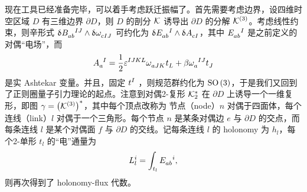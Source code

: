 			现在工具已经准备完毕，可以着手考虑跃迁振幅了。首先需要考虑边界，设四维时空区域 $D$ 有三维边界 $\partial D$，则 $D$ 的剖分 $\mathcal{K}$ 诱导出 $\partial D$ 的分解 $\mathcal{K}^{(3)}$。考虑线性约束，则辛形式 $\updelta \tensor{B}{_a_b^I^J} \wedge \updelta \tensor{\omega}{_c_I_J}$ 可约化为 $\updelta \tensor{E}{_a_b^I} \wedge \updelta \tensor{A}{_c_I}$，其中 $\tensor{E}{_a_b^I}$ 是之前定义的对偶“电场”，而
			\begin{equation}
				\tensor{A}{_a^I} = \frac{1}{2} \tensor{\vol}{^I^J^K^L} \tensor{\omega}{_a_J_K} \tensor{t}{_L} + \beta \tensor{\omega}{_a^I^J} \tensor{t}{_J}
			\end{equation}
			是实 Ashtekar 变量。并且，固定 $\tensor{t}{^I}$ ，则规范群约化为 $\mathrm{SO}\left(3\right)$，于是我们又回到了正则圈量子引力理论的起点。注意到对偶2-复形 $\mathcal{K}^*_2$ 在 $\partial D$ 上诱导一个一维复形，即图 $\gamma = \left(\mathcal{K}^{(3)}\right)^*$，其中每个顶点改称为 节点（node）$n$ 对偶于四面体，每个连线（link）$l$ 对偶于一个三角形。每个节点 $n$ 是某条对偶边 $e$ 与 $\partial D$ 的交点，而每条连线 $l$ 是某个对偶面 $f$ 与 $\partial D$ 的交线。记每条连线 $l$ 的 holonomy 为 $h_l$，每个2-单形 $t_l$ 的“电”通量为
			\begin{equation}
				L^i_l = \int_{t_l} \tensor{E}{_a_b^i},
			\end{equation}
			则再次得到了 holonomy-flux 代数。

